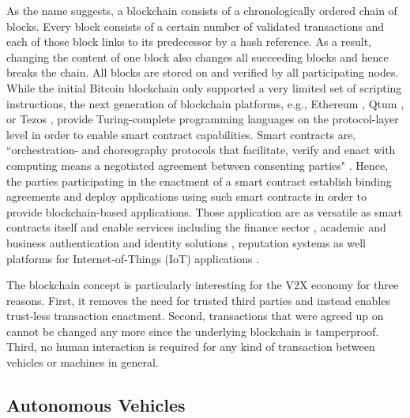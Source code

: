 \documentclass{llncs}
\begin{document}
{			As the name suggests, a blockchain consists of a chronologically ordered chain of blocks. Every block consists of a certain number of validated transactions and each of those block links to its predecessor by a hash reference. As a result, changing the content of one block also changes all succeeding blocks and hence breaks the chain. All blocks are stored on and verified by all participating nodes. While the initial Bitcoin blockchain only supported a very limited set of scripting instructions, the next generation of blockchain platforms, e.g., Ethereum \cite{wood2014ethereum}, Qtum \cite{qtumWhitepaper}, or Tezos \cite{tezosWhitepaper}, provide Turing-complete programming languages on the protocol-layer level in order to enable smart contract capabilities. Smart contracts are, ``orchestration- and choreography protocols that facilitate, verify and enact with computing means a negotiated agreement between consenting parties" \cite{qtumWhitepaper}. Hence, the parties participating in the enactment of a smart contract establish binding agreements and deploy applications using such smart contracts in order to provide blockchain-based applications. Those application are as versatile as smart contracts itself and enable services including the finance sector \cite{nguyen2016blockchain}\cite{saltWhitepaper}, academic and business authentication and identity solutions \cite{leidingUnchained}\cite{CivicWhitepaper}\cite{AuthcoinLeiding2016MCIS}\cite{mccorry2015authenticated}\cite{SelfkeyWhitepaper}, reputation systems \cite{SemadaWhitepaper} as well platforms for Internet-of-Things (IoT) applications \cite{christidis2016blockchains}\cite{ouaddah2017towards}. 	
			
			The blockchain concept is particularly interesting for the V2X economy for three reasons. First, it removes the need for trusted third parties and instead enables trust-less transaction enactment. Second, transactions that were agreed up on cannot be changed any more since the underlying blockchain is tamperproof. Third, no human interaction is required for any kind of transaction between vehicles or machines in general.

		
		\subsection{Autonomous Vehicles}
			\label{ss:autonomous-vehicles}

}
\end{document}
